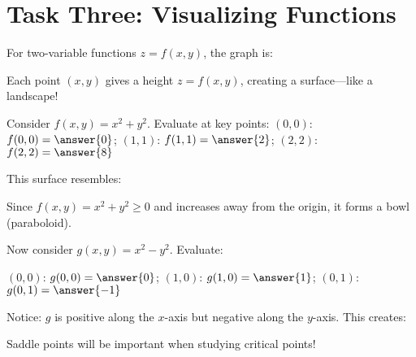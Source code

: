 \documentclass{ximera}
\begin{document}
\section*{Task Three: Visualizing Functions}

\begin{problem}
For two-variable functions $z = f(x,y)$, the graph is:
\begin{multipleChoice}
\end{multipleChoice}

\begin{feedback}
Each point $(x, y)$ gives a height $z = f(x, y)$, creating a surface—like a landscape!
\end{feedback}
\end{problem}

\begin{problem}
Consider $f(x, y) = x^2 + y^2$. Evaluate at key points: 
$(0, 0)$: $f(0, 0) = \answer{0}$;  $(1, 1)$: $f(1, 1) = \answer{2}$;  $(2, 2)$: $f(2, 2) = \answer{8}$

This surface resembles:
\begin{multipleChoice}
\end{multipleChoice}

\begin{feedback}
Since $f(x,y) = x^2 + y^2 \geq 0$ and increases away from the origin, it forms a bowl (paraboloid).
\end{feedback}
\end{problem}

\begin{problem}
Now consider $g(x, y) = x^2 - y^2$. Evaluate:

$(0, 0)$: $g(0, 0) = \answer{0}$;  $(1, 0)$: $g(1, 0) = \answer{1}$;  $(0, 1)$: $g(0, 1) = \answer{-1}$

Notice: $g$ is positive along the $x$-axis but negative along the $y$-axis. This creates:
\begin{multipleChoice}
\end{multipleChoice}

\begin{feedback}
Saddle points will be important when studying critical points!
\end{feedback}
\end{problem}
\end{document}
